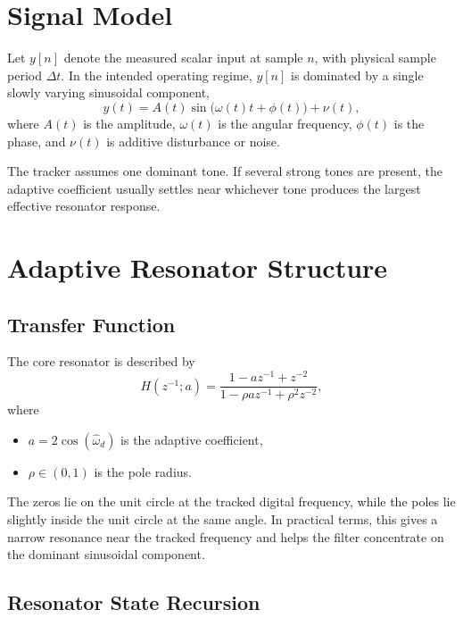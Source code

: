 \documentclass[conference]{IEEEtran}
\begin{document}
\section{Signal Model}

Let $y[n]$ denote the measured scalar input at sample $n$, with physical
sample period $\Delta t$. In the intended operating regime, $y[n]$ is
dominated by a single slowly varying sinusoidal component,
\begin{equation}\label{eq:signal}
  y(t) = A(t)\sin\!\bigl(\omega(t)t + \phi(t)\bigr) + \nu(t),
\end{equation}
where $A(t)$ is the amplitude, $\omega(t)$ is the angular frequency,
$\phi(t)$ is the phase, and $\nu(t)$ is additive disturbance or noise.

The tracker assumes one dominant tone. If several strong tones are present,
the adaptive coefficient usually settles near whichever tone produces the
largest effective resonator response.

\section{Adaptive Resonator Structure}\label{sec:resonator}

\subsection{Transfer Function}

The core resonator is described by
\begin{equation}\label{eq:tf}
  H(z^{-1};a)=
  \frac{1-a z^{-1}+z^{-2}}
       {1-\rho a z^{-1}+\rho^2 z^{-2}},
\end{equation}
where
\begin{itemize}[leftmargin=1.4em]
  \item $a = 2\cos(\hat\omega_d)$ is the adaptive coefficient,
  \item $\rho \in (0,1)$ is the pole radius.
\end{itemize}

The zeros lie on the unit circle at the tracked digital frequency, while the
poles lie slightly inside the unit circle at the same angle. In practical
terms, this gives a narrow resonance near the tracked frequency and helps the
filter concentrate on the dominant sinusoidal component.

\subsection{Resonator State Recursion}
\end{document}
